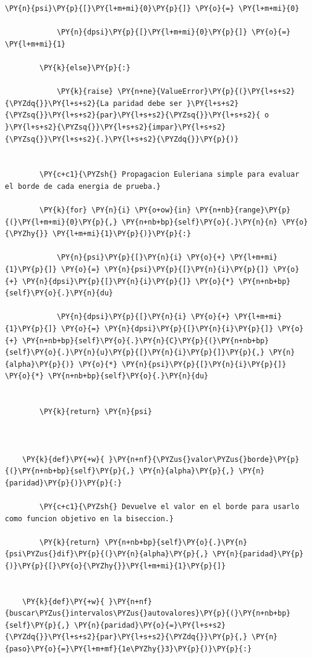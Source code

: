 \documentclass[11pt]{article}
\makeatletter
\def\PY@reset{\let\PY@it=\relax \let\PY@bf=\relax \let\PY@ul=\relax \let\PY@tc=\relax \let\PY@bc=\relax \let\PY@ff=\relax}
\def\PY@tok#1{\csname PY@tok@#1\endcsname}
\def\PY@toks#1+{\ifx\relax#1\empty\else \PY@tok{#1}\expandafter\PY@toks\fi}
\def\PY@do#1{\PY@bc{\PY@tc{\PY@ul{\PY@it{\PY@bf{\PY@ff{#1}}}}}}}
\def\PY#1#2{\PY@reset\PY@toks#1+\relax+\PY@do{#2}}
\makeatother
\begin{document}
\begin{tcolorbox}[breakable, size=fbox, boxrule=1pt, pad at break*=1mm,colback=cellbackground, colframe=cellborder]
\begin{Verbatim}[commandchars=\\\{\}]
            \PY{n}{psi}\PY{p}{[}\PY{l+m+mi}{0}\PY{p}{]} \PY{o}{=} \PY{l+m+mi}{0}

            \PY{n}{dpsi}\PY{p}{[}\PY{l+m+mi}{0}\PY{p}{]} \PY{o}{=} \PY{l+m+mi}{1}

        \PY{k}{else}\PY{p}{:}

            \PY{k}{raise} \PY{n+ne}{ValueError}\PY{p}{(}\PY{l+s+s2}{\PYZdq{}}\PY{l+s+s2}{La paridad debe ser }\PY{l+s+s2}{\PYZsq{}}\PY{l+s+s2}{par}\PY{l+s+s2}{\PYZsq{}}\PY{l+s+s2}{ o }\PY{l+s+s2}{\PYZsq{}}\PY{l+s+s2}{impar}\PY{l+s+s2}{\PYZsq{}}\PY{l+s+s2}{.}\PY{l+s+s2}{\PYZdq{}}\PY{p}{)}


        \PY{c+c1}{\PYZsh{} Propagacion Euleriana simple para evaluar el borde de cada energia de prueba.}

        \PY{k}{for} \PY{n}{i} \PY{o+ow}{in} \PY{n+nb}{range}\PY{p}{(}\PY{l+m+mi}{0}\PY{p}{,} \PY{n+nb+bp}{self}\PY{o}{.}\PY{n}{n} \PY{o}{\PYZhy{}} \PY{l+m+mi}{1}\PY{p}{)}\PY{p}{:}

            \PY{n}{psi}\PY{p}{[}\PY{n}{i} \PY{o}{+} \PY{l+m+mi}{1}\PY{p}{]} \PY{o}{=} \PY{n}{psi}\PY{p}{[}\PY{n}{i}\PY{p}{]} \PY{o}{+} \PY{n}{dpsi}\PY{p}{[}\PY{n}{i}\PY{p}{]} \PY{o}{*} \PY{n+nb+bp}{self}\PY{o}{.}\PY{n}{du}

            \PY{n}{dpsi}\PY{p}{[}\PY{n}{i} \PY{o}{+} \PY{l+m+mi}{1}\PY{p}{]} \PY{o}{=} \PY{n}{dpsi}\PY{p}{[}\PY{n}{i}\PY{p}{]} \PY{o}{+} \PY{n+nb+bp}{self}\PY{o}{.}\PY{n}{C}\PY{p}{(}\PY{n+nb+bp}{self}\PY{o}{.}\PY{n}{u}\PY{p}{[}\PY{n}{i}\PY{p}{]}\PY{p}{,} \PY{n}{alpha}\PY{p}{)} \PY{o}{*} \PY{n}{psi}\PY{p}{[}\PY{n}{i}\PY{p}{]} \PY{o}{*} \PY{n+nb+bp}{self}\PY{o}{.}\PY{n}{du}


        \PY{k}{return} \PY{n}{psi}

    

    \PY{k}{def}\PY{+w}{ }\PY{n+nf}{\PYZus{}valor\PYZus{}borde}\PY{p}{(}\PY{n+nb+bp}{self}\PY{p}{,} \PY{n}{alpha}\PY{p}{,} \PY{n}{paridad}\PY{p}{)}\PY{p}{:}

        \PY{c+c1}{\PYZsh{} Devuelve el valor en el borde para usarlo como funcion objetivo en la biseccion.}

        \PY{k}{return} \PY{n+nb+bp}{self}\PY{o}{.}\PY{n}{psi\PYZus{}dif}\PY{p}{(}\PY{n}{alpha}\PY{p}{,} \PY{n}{paridad}\PY{p}{)}\PY{p}{[}\PY{o}{\PYZhy{}}\PY{l+m+mi}{1}\PY{p}{]}


    \PY{k}{def}\PY{+w}{ }\PY{n+nf}{buscar\PYZus{}intervalos\PYZus{}autovalores}\PY{p}{(}\PY{n+nb+bp}{self}\PY{p}{,} \PY{n}{paridad}\PY{o}{=}\PY{l+s+s2}{\PYZdq{}}\PY{l+s+s2}{par}\PY{l+s+s2}{\PYZdq{}}\PY{p}{,} \PY{n}{paso}\PY{o}{=}\PY{l+m+mf}{1e\PYZhy{}3}\PY{p}{)}\PY{p}{:}


\end{Verbatim}
\end{tcolorbox}
\end{document}
